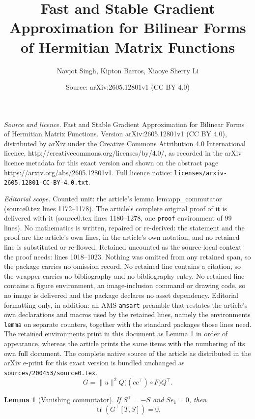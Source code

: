 \documentclass[10pt,a4paper]{amsart}
\title{Fast and Stable Gradient Approximation for Bilinear Forms of Hermitian Matrix Functions}
\author{Navjot Singh, Kipton Barros, Xiaoye Sherry Li}
\date{Source: arXiv:2605.12801v1 (CC BY 4.0)}
\newtheorem{lemma}{Lemma}
\begin{document}
\maketitle

\noindent\emph{Source and licence.} Fast and Stable Gradient Approximation for Bilinear Forms of Hermitian Matrix Functions. Version arXiv:2605.12801v1 (CC BY 4.0), distributed by arXiv under the Creative Commons Attribution 4.0 International licence, http://creativecommons.org/licenses/by/4.0/, as recorded in the arXiv licence metadata for this exact version and shown on the abstract page https://arxiv.org/abs/2605.12801v1. Full licence notice: \texttt{licenses/arxiv-2605.12801-CC-BY-4.0.txt}.\par\smallskip

\noindent\textit{Editorial scope.} Counted unit: the article's lemma lem:app\_commutator (source0.tex lines 1172--1178). The article's complete original proof of it is delivered with it (source0.tex lines 1180--1278, one \texttt{proof} environment of 99 lines). No mathematics is written, repaired or re-derived: the statement and the proof are the article's own lines, in the article's own notation, and no retained line is substituted or re-flowed.  Retained uncounted as the source-local context the proof needs: lines 1018--1023.  Nothing was omitted from any retained span, so the package carries no omission record.  No retained line contains a citation, so the wrapper carries no bibliography and no bibliography entry.  No retained line contains a figure environment, an image-inclusion command or drawing code, so no image is delivered and the package declares no asset dependency.  Editorial formatting only, in addition: an AMS \texttt{amsart} preamble that restates the article's own declarations and macros used by the retained lines, namely the environments \texttt{lemma} on separate counters, together with the standard packages those lines need.  The retained environments print in this document as Lemma 1 in order of appearance, whereas the article prints the same items with the numbering of its own full document.  The complete native source of the article as distributed in the arXiv e-print for this exact version is bundled unchanged as \texttt{sources/200453/source0.tex}.
\begin{equation}
    G
    =
    \|u\|^2 Q\bigl((cc^\top)\circ F\bigr)Q^\top .
    \label{eq:app_G}
\end{equation}

\begin{lemma}[Vanishing commutator]
\label{lem:app_commutator}
If \(S^\top=-S\) and \(Se_1=0\), then
\[
    \operatorname{tr}(G^\top[T,S])=0 .
\]
\end{lemma}
\end{document}
